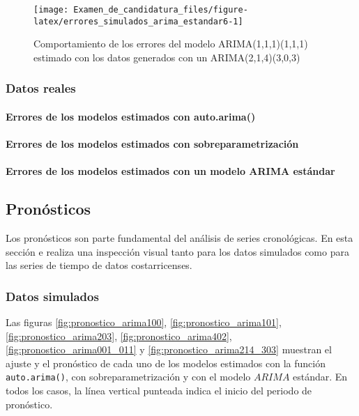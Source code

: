 \documentclass[
]{article}
\begin{document}
\begin{figure}[H]
\texttt{[image: Examen\_de\_candidatura\_files/figure-latex/errores\_simulados\_arima\_estandar6-1]} \caption{Comportamiento de los errores del modelo ARIMA(1,1,1)(1,1,1) estimado con los datos generados con un ARIMA(2,1,4)(3,0,3)}\label{fig:errores_simulados_arima_estandar6}
\end{figure}

\subsubsection{Datos reales}

\paragraph{Errores de los modelos estimados con auto.arima()}

\paragraph{Errores de los modelos estimados con sobreparametrización}

\paragraph{Errores de los modelos estimados con un modelo ARIMA estándar}

\subsection{Pronósticos}

Los pronósticos son parte fundamental del análisis de series
cronológicas. En esta sección e realiza una inspección visual tanto para
los datos simulados como para las series de tiempo de datos
costarricenses.

\subsubsection{Datos simulados}

Las figuras \ref{fig:pronostico_arima100},
\ref{fig:pronostico_arima101}, \ref{fig:pronostico_arima203},
\ref{fig:pronostico_arima402}, \ref{fig:pronostico_arima001_011} y
\ref{fig:pronostico_arima214_303} muestran el ajuste y el pronóstico de
cada uno de los modelos estimados con la función \texttt{auto.arima()},
con sobreparametrización y con el modelo \(ARIMA\) estándar. En todos
los casos, la línea vertical punteada indica el inicio del periodo de
pronóstico.
\end{document}
